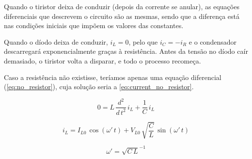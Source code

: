 \documentclass[a4paper,11pt]{article}
\numberwithin{equation}{section}
\begin{document}

Quando o tiristor deixa de conduzir (depois da corrente se anular), as equações diferenciais que descrevem o circuito são as mesmas, sendo que a diferença está nas condições iniciais que impõem os valores das constantes.

Quando o díodo deixa de conduzir, $i_L = 0$, pelo que $i_C = -i_R$ e o condensador descarregará exponencialmente graças à resistência. Antes da tensão no díodo caír demasiado, o tiristor volta a disparar, e todo o processo recomeça.

Caso a resistência não existisse, teríamos apenas uma equação diferencial (\autoref{eq:no_resistor}), cuja solução seria a \autoref{eq:current_no_resistor}.

\begin{equation}
\label{eq:no_resistor}
0 = L\,\frac{d^2}{d\,t^2}\,i_L + \frac{1}{C}\,i_L
\end{equation}

\begin{equation}
\label{eq:current_no_resistor}
i_L = I_{L0}\,\cos{(\omega'\,t)} + V_{L0}\,\sqrt{\frac{C}{L}}\,\sin{(\omega'\,t)}
\end{equation}

\begin{equation}
\omega'=\sqrt{C\,L}^{-1}
\end{equation}
\end{document}
